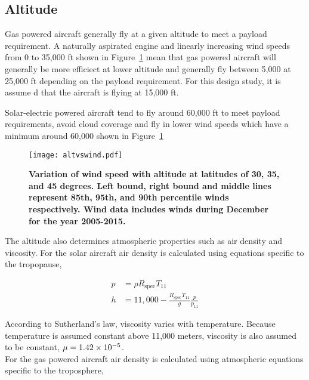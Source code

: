 \documentclass[]{aiaa-tc}%
\begin{document}
\subsection{Altitude}

Gas powered aircraft generally fly at a given altitude to meet a payload requirement.  
A naturally aspirated engine and linearly increasing wind speeds from 0 to 35,000 ft shown in Figure~\ref{f:altvswind} mean that gas powered aircraft will generally be more efficiect at lower altitude and generally fly between 5,000 at 25,000 ft depending on the payload requirement.  
For this design study, it is assume d that the aircraft is flying at 15,000 ft. 

Solar-electric powered aircraft tend to fly around 60,000 ft to meet payload requirements, avoid cloud coverage and fly in lower wind speeds which have a minimum around 60,000 shown in Figure~\ref{f:altvswind}

\begin{figure}[H]
	\begin{center}
	\texttt{[image: altvswind.pdf]}
    \caption{\textbf{Variation of wind speed with altitude at latitudes of 30, 35, and 45 degrees.  Left bound, right bound and middle lines represent 85th, 95th, and 90th percentile winds respectively. Wind data includes winds during December for the year 2005-2015.}}
	\label{f:altvswind}
	\end{center}
\end{figure}

The altitude also determines atmospheric properties such as air density and viscosity.  For the solar aircraft air density is calculated using equations specific to the tropopause,\cite{isaatm} 

\begin{align}
    \label{e:tropopress}
    p &= \rho R_{\text{spec}}T_{11} \\
    \label{e:tropoalt}
    h &= 11,000 - \frac{R_{\text{spec}}T_{11}}{g}\frac{p}{p_{11}} 
\end{align}

According to Sutherland's law\cite{fluiddyhandbook}, viscosity varies with temperature.  Because temperature is assumed constant above 11,000 meters\cite{isaatm}, viscosity is also assumed to be constant, $\mu=\num{1.42d-5}$. \\

For the gas powered aircraft air density is calculated using atmospheric equations specific to the troposphere,\cite{isaatm} 
\end{document}
